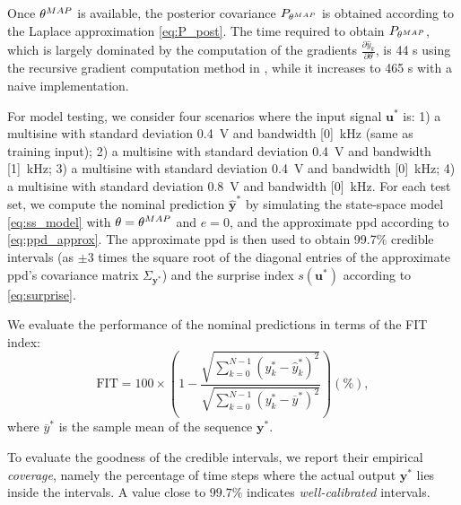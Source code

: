 \documentclass{ifacconf}
\newcommand{\nsamp}{N}
\newcommand{\MAP}{{\rm MAP}}
\newcommand{\tvec}[1]{{\mathbf{#1}}}
\newcommand{\mean}[1]{\hat{#1}}
\begin{document}
Once $\theta^\MAP$ is available, the posterior covariance $P_{\theta^\MAP}$ is obtained according to the Laplace approximation \eqref{eq:P_post}. The time required to obtain $P_{\theta^\MAP}$, which is largely dominated by the computation of the gradients $\frac{\partial \mean{y}_k}{\partial \theta}$, is  44 s using the recursive gradient computation method in \cite{forgione2022adaptation}, while it increases to 465 s with a naive implementation.

For model testing, we consider four  scenarios where the input signal $\tvec{u}^*$ is:
 1) a multisine with standard deviation 0.4~V and bandwidth [0]~kHz (same as training input);
 2) a multisine with standard deviation 0.4~V and bandwidth [1]~kHz;
 3) a multisine with standard deviation 0.4~V and bandwidth [0]~kHz;
 4) a multisine with standard deviation 0.8~V and bandwidth [0]~kHz.
 For each test set, we compute the nominal prediction $\mean{\tvec{y}}^*$ by simulating the state-space model \eqref{eq:ss_model} with $\theta=\theta^\MAP$ and  $e=0$, and the approximate ppd according to \eqref{eq:ppd_approx}. The approximate ppd is then used to obtain 99.7\% credible intervals (as $\pm 3$ times the square root of the diagonal entries of the approximate ppd's covariance matrix $\Sigma_{\tvec{y}^*}$) and the surprise index $s(\tvec{u}^*)$ according to \eqref{eq:surprise}.

 
We evaluate the performance of the nominal predictions in terms of the FIT index:
\begin{equation}
\label{eq:fit_index}
\mathrm{FIT} = 100 \times \left(1- \frac{\sqrt{\sum_{k=0}^{\nsamp-1} \left({y}^*_k -  \mean{y}^*_k\right)^2} }  
{\sqrt{\sum_{k=0}^{\nsamp-1} \left({y}^*_k -  {\overline{y}^*}\right)^2}}\right) (\%),
\end{equation}
where ${\overline{y}^*}$ is the sample mean of the sequence $\tvec{y}^*$. %

To evaluate the goodness of the credible intervals, we report their empirical \emph{coverage}, namely the percentage 
of time steps where the actual output $\tvec{y}^*$ lies inside the intervals. A value close to $99.7\%$ indicates \emph{well-calibrated} intervals.
\end{document}
